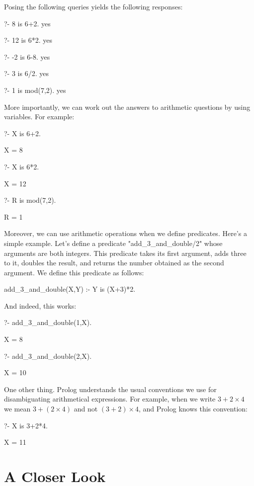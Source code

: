 Posing the following queries yields the following responses:

\begin{LPNcodedisplay}
?- 8 is 6+2.
yes

?- 12 is 6*2.
yes

?- -2 is 6-8.
yes

?- 3 is 6/2.
yes

?- 1 is mod(7,2).
yes
\end{LPNcodedisplay}


More importantly, we can work out the answers to arithmetic questions
by using variables.  For example:

\begin{LPNcodedisplay}
?- X is 6+2.

X = 8

?- X is 6*2.

X = 12

?- R is mod(7,2).

R = 1
\end{LPNcodedisplay}

Moreover, we can use arithmetic operations when we define predicates.
Here's a simple example.  Let's define a predicate
"add\_3\_and\_double/2" whose arguments are both integers.  This
predicate takes its first argument, adds three to it, doubles the
result, and returns the number obtained as the second argument.  We
define this predicate as follows:
\begin{LPNcodedisplay}
add_3_and_double(X,Y) :- Y is (X+3)*2.
\end{LPNcodedisplay}
And indeed, this works:
\begin{LPNcodedisplay}
?- add_3_and_double(1,X).

X = 8

?- add_3_and_double(2,X).

X = 10
\end{LPNcodedisplay}


One other thing.  Prolog understands the usual conventions we use for
disambiguating arithmetical expressions.  For example, when we write
$3+2\times 4$ we mean $3+(2\times 4)$ and not $(3+2)\times 4$, and
Prolog knows this convention:
\begin{LPNcodedisplay}
?- X is 3+2*4.

X = 11
\end{LPNcodedisplay}





\section{A Closer Look}\label{SEC.L5.LOOK}

